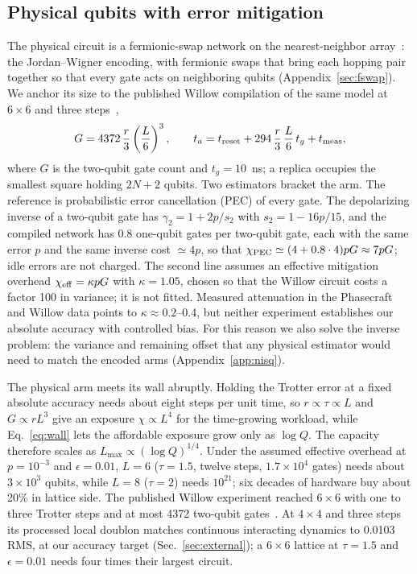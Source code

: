 \documentclass[11pt]{article}
\newcommand{\eps}{\epsilon}
\begin{document}
\subsection{Physical qubits with error mitigation}\label{sec:nisq}
The physical circuit is a fermionic-swap network on the nearest-neighbor
array~\cite{kivlichan2018}: the Jordan--Wigner encoding, with fermionic swaps
that bring each hopping pair together so that every gate acts on neighboring
qubits (Appendix~\ref{sec:fswap}). We anchor its size to the published Willow
compilation of the same model at $6\times6$ and three steps~\cite{phasecraftwillow2025},
\begin{equation}\label{eq:nisq-gates}
 G=4372\,\frac{r}{3}\left(\frac{L}{6}\right)^3,\qquad
 t_a=t_{\rm reset}+294\,\frac{r}{3}\,\frac{L}{6}\,t_g+t_{\rm meas},
\end{equation}
where $G$ is the two-qubit gate count and $t_g=10$~ns; a replica occupies the
smallest square holding $2N+2$ qubits. Two estimators bracket the arm. The
reference is probabilistic error cancellation (PEC) of every gate. The
depolarizing inverse of a two-qubit gate has $\gamma_2=1+2p/s_2$ with
$s_2=1-16p/15$, and the compiled network has 0.8 one-qubit gates per two-qubit
gate, each with the same error $p$ and the same inverse cost $\simeq4p$, so that
$\chi_{\rm PEC}\simeq(4+0.8\cdot4)pG\approx7pG$;
idle errors are not charged. The second line assumes an
effective mitigation overhead $\chi_{\rm eff}=\kappa pG$ with $\kappa=1.05$,
chosen so that the Willow circuit costs a factor 100 in variance; it is not
fitted. Measured attenuation in the Phasecraft and Willow data points to
$\kappa\approx0.2$--0.4, but neither experiment establishes our absolute
accuracy with controlled bias. For this reason we also solve the inverse
problem: the variance and remaining offset that any physical estimator would
need to match the encoded arms (Appendix~\ref{app:nisq}).

The physical arm meets its wall abruptly. Holding the Trotter error at a fixed
absolute accuracy needs about eight steps per unit time, so $r\propto\tau\propto L$
and $G\propto rL^3$ give an exposure $\chi\propto L^4$ for the time-growing
workload, while Eq.~\eqref{eq:wall} lets the affordable exposure grow only as
$\log Q$. The capacity therefore scales as $L_{\max}\propto(\log Q)^{1/4}$.
Under the assumed effective overhead at $p=10^{-3}$ and $\eps=0.01$, $L=6$
($\tau=1.5$, twelve steps, $1.7\times10^4$ gates) needs about $3\times10^3$ qubits,
while $L=8$ ($\tau=2$) needs $10^{21}$; six decades of hardware buy about 20\% in
lattice side. The published Willow experiment reached $6\times6$ with one to
three Trotter steps and at most 4372 two-qubit gates~\cite{phasecraftwillow2025}.
At $4\times4$ and three steps its processed local doublon matches continuous
interacting dynamics to 0.0103 RMS, at our accuracy target (Sec.~\ref{sec:external});
a $6\times6$ lattice at $\tau=1.5$ and $\eps=0.01$ needs four times their largest
circuit.
\end{document}
